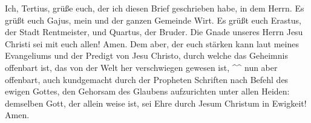  Ich, Tertius, grüße euch, der ich diesen Brief geschrieben
habe, in dem Herrn.  Es grüßt euch Gajus, mein und der
ganzen Gemeinde Wirt. Es grüßt euch Erastus, der Stadt Rentmeister, und
Quartus, der Bruder.  Die Gnade unseres Herrn Jesu Christi
sei mit euch allen! Amen.  Dem aber, der euch stärken kann
laut meines Evangeliums und der Predigt von Jesu Christo, durch welche
das Geheimnis offenbart ist, das von der Welt her verschwiegen gewesen
ist, \^{}\^{}  nun aber offenbart, auch kundgemacht durch
der Propheten Schriften nach Befehl des ewigen Gottes, den Gehorsam des
Glaubens aufzurichten unter allen Heiden:  demselben Gott,
der allein weise ist, sei Ehre durch Jesum Christum in Ewigkeit! Amen.
